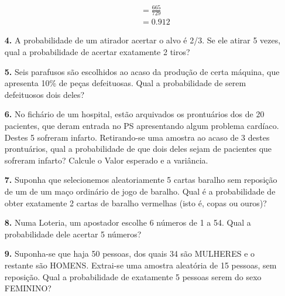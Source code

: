 \begin{itemize}
\begin{itemize}
{\begin{align*}
	        &= \frac{665}{729}\\
	        &= 0.912
	    \end{align*}}
	\end{itemize}
\newpage
	\item[\textbf{4.}] A probabilidade de um atirador acertar o alvo é 2/3. Se ele atirar 5 vezes, qual a probabilidade de acertar exatamente 2 tiros?\\
	\item[\textbf{5.}] Seis parafusos são escolhidos ao acaso da produção de certa máquina, que apresenta 10\% de peças defeituosas. Qual a probabilidade de serem defeituosos dois deles?\\
	\item[\textbf{6.}] No fichário de um hospital, estão arquivados os prontuários dos de 20 pacientes, que deram entrada no PS apresentando algum problema cardíaco. Destes 5 sofreram infarto. Retirando-se uma amostra ao acaso de 3 destes prontuários, qual a probabilidade de que dois deles sejam de pacientes que sofreram infarto? Calcule o Valor esperado e a variância.
	\resposta{} 
	\item[\textbf{7.}] Suponha que selecionemos aleatoriamente 5 cartas baralho sem reposição de um de um maço ordinário de jogo de baralho. Qual é a probabilidade de obter exatamente 2 cartas de baralho vermelhas (isto é, copas ou ouros)?
	\resposta{} 
	\item[\textbf{8.}] Numa Loteria, um apostador escolhe 6 números de 1 a 54. Qual a probabilidade dele acertar 5 números?
	\resposta{} 
	\item[\textbf{9.}] Suponha-se que haja 50 pessoas, dos quais 34 são MULHERES e o restante são HOMENS. Extrai-se uma amostra aleatória de 15 pessoas, sem reposição. Qual a probabilidade de exatamente 5 pessoas serem do sexo FEMININO?
	\resposta{} 
	

\end{itemize}
